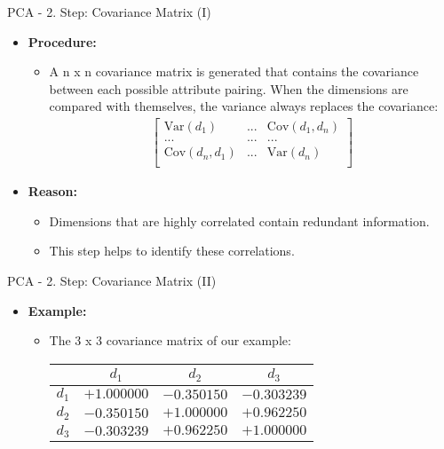 \begin{frame}{PCA - 2. Step: Covariance Matrix (I)}
	\begin{itemize}
		\item \textbf{Procedure:}
		      \begin{itemize}
			      \item A n x n covariance matrix is generated that contains the
			            covariance between each possible attribute pairing. When the
			            dimensions are compared with themselves, the variance always
			            replaces the covariance:
			            \begin{align*}
				            \begin{bmatrix}
					            \text{Var}(d_1)      & ... & \text{Cov}(d_1, d_n) \\
					            ...                  & ... & ...                  \\
					            \text{Cov}(d_n, d_1) & ... & \text{Var}(d_n)      \\
				            \end{bmatrix}
			            \end{align*}
		      \end{itemize}
		\item \textbf{Reason:}
		      \begin{itemize}
			      \item Dimensions that are highly correlated contain redundant
			            information.
			      \item This step helps to identify these correlations.
		      \end{itemize}
	\end{itemize}
\end{frame}

\begin{frame}{PCA - 2. Step: Covariance Matrix (II)}
	\begin{itemize}
		\item \textbf{Example:}
		      \begin{itemize}
			      \item The 3 x 3 covariance matrix of our example: \\
			            \vspace{3mm}
			            \begin{center}
				            \centering
				            \begin{tabular}{|l|c|c|c|}
					            \hline
					                  & $d_1$       & $d_2$       & $d_3$
					            \\\hline
					            $d_1$ & $+1.000000$ & $-0.350150$ & $-0.303239$
					            \\\hline
					            $d_2$ & $-0.350150$ & $+1.000000$ & $+0.962250$
					            \\\hline
					            $d_3$ & $-0.303239$ & $+0.962250$ & $+1.000000$
					            \\\hline
				            \end{tabular}
			            \end{center}
		      \end{itemize}
	\end{itemize}
\end{frame}

